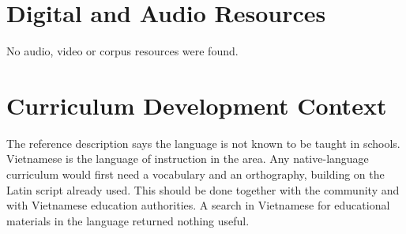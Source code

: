 \documentclass[12pt]{article}
\begin{document}
\section{Digital and Audio Resources}
No audio, video or corpus resources were found.

\section{Curriculum Development Context}
The reference description says the language is not known to be taught in schools. Vietnamese is the language of instruction in the area. Any native-language curriculum would first need a vocabulary and an orthography, building on the Latin script already used. This should be done together with the community and with Vietnamese education authorities. A search in Vietnamese for educational materials in the language returned nothing useful.
\end{document}
